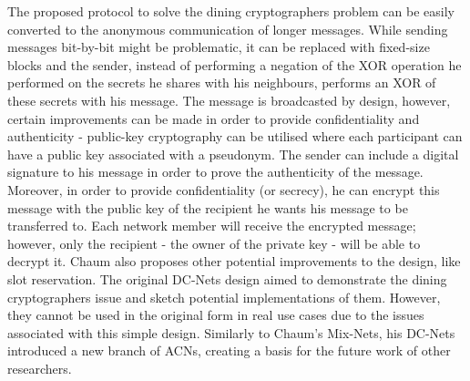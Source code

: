 The proposed protocol to solve the dining cryptographers problem can be easily converted to the anonymous communication of longer messages. While sending messages bit-by-bit might be problematic, it can be replaced with fixed-size blocks and the sender, instead of performing a negation of the XOR operation he performed on the secrets he shares with his neighbours, performs an XOR of these secrets with his message. The message is broadcasted by design, however, certain improvements can be made in order to provide confidentiality and authenticity - public-key cryptography can be utilised where each participant can have a public key associated with a pseudonym. The sender can include a digital signature to his message in order to prove the authenticity of the message. Moreover, in order to provide confidentiality (or secrecy), he can encrypt this message with the public key of the recipient he wants his message to be transferred to. Each network member will receive the encrypted message; however, only the recipient - the owner of the private key - will be able to decrypt it.
Chaum also proposes other potential improvements to the design, like slot reservation.
The original DC-Nets design aimed to demonstrate the dining cryptographers issue and sketch potential implementations of them. However, they cannot be used in the original form in real use cases due to the issues associated with this simple design. Similarly to Chaum’s Mix-Nets, his DC-Nets introduced a new branch of ACNs, creating a basis for the future work of other researchers.

